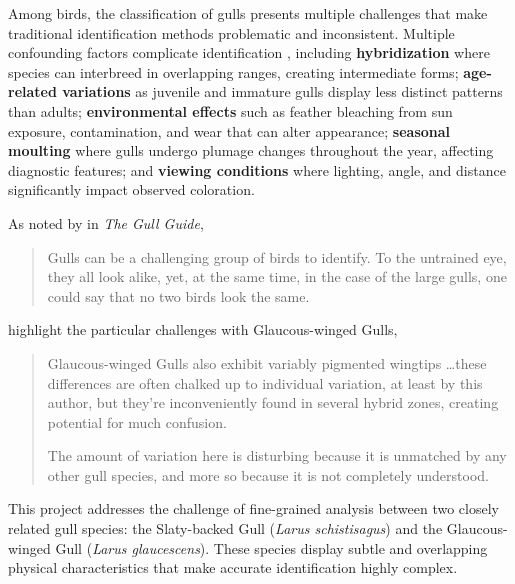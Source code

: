 \documentclass[a4paper,12pt]{report}
\newenvironment{smallquote}
  {\begin{quote}\footnotesize\vspace{0em}}
  {\vspace{0em}\end{quote}}
\begin{document}
Among birds, the classification of gulls presents multiple challenges that make traditional identification methods problematic and inconsistent. Multiple confounding factors complicate identification \citep{adriaens2022}, including \textbf{hybridization} where species can interbreed in overlapping ranges, creating intermediate forms; \textbf{age-related variations} as juvenile and immature gulls display less distinct patterns than adults; \textbf{environmental effects} such as feather bleaching from sun exposure, contamination, and wear that can alter appearance; \textbf{seasonal moulting} where gulls undergo plumage changes throughout the year, affecting diagnostic features; and \textbf{viewing conditions} where lighting, angle, and distance significantly impact observed coloration.

As noted by \citep{ayyash2024} in \textit{The Gull Guide},
\begin{smallquote}
    Gulls can be a challenging group of birds to identify. To the untrained eye, they all look alike, yet, at the same time, in the case of the large gulls, one could say that no two birds look the same.
\end{smallquote}

\citep{adriaens2022} highlight the particular challenges with Glaucous-winged Gulls,
\begin{smallquote}
    Glaucous-winged Gulls also exhibit variably pigmented wingtips \ldots these differences are often chalked up to individual variation, at least by this author, but they're inconveniently found in several hybrid zones, creating potential for much confusion.
    
    The amount of variation here is disturbing because it is unmatched by any other gull species, and more so because it is not completely understood.
\end{smallquote}

This project addresses the challenge of fine-grained analysis between two closely related gull species: the Slaty-backed Gull (\textit{Larus schistisagus}) and the Glaucous-winged Gull (\textit{Larus glaucescens}). These species display subtle and overlapping physical characteristics that make accurate identification highly complex.
\end{document}
